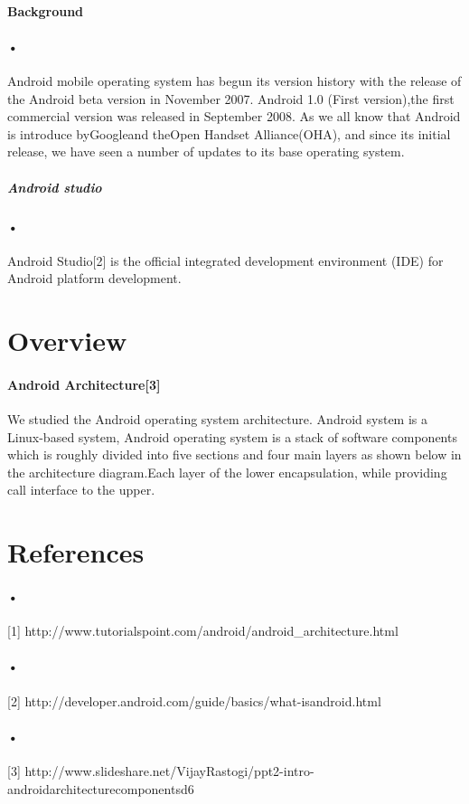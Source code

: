 \documentclass[12pt]{article}
\begin{document}
\paragraph{Background}
\paragraph{•}
Android mobile operating system has begun its version history with the release of the Android beta version in November 2007. Android 1.0 (First version),the first commercial version was released in September 2008. As we all know that Android is introduce byGoogleand theOpen Handset Alliance(OHA), and since its initial release, we have seen a number of updates to its base operating system.

\subparagraph{Android studio}
\paragraph{•}
Android Studio[2] is the official integrated development environment (IDE) for Android platform development.

\section{Overview}
\paragraph{Android Architecture[3]}
We studied the Android operating system architecture.
Android system is a Linux-based system, Android operating
system is a stack of software components which is roughly
divided into five sections and four main layers as shown
below in the architecture diagram.Each layer of the lower
encapsulation, while providing call interface to the upper.

\section{References}
\paragraph{•}
[1] http://www.tutorialspoint.com/android/android_architecture.html
\paragraph{•}
[2] http://developer.android.com/guide/basics/what-isandroid.html
\paragraph{•}
[3] http://www.slideshare.net/VijayRastogi/ppt2-intro-androidarchitecturecomponentsd6
\end{document}
